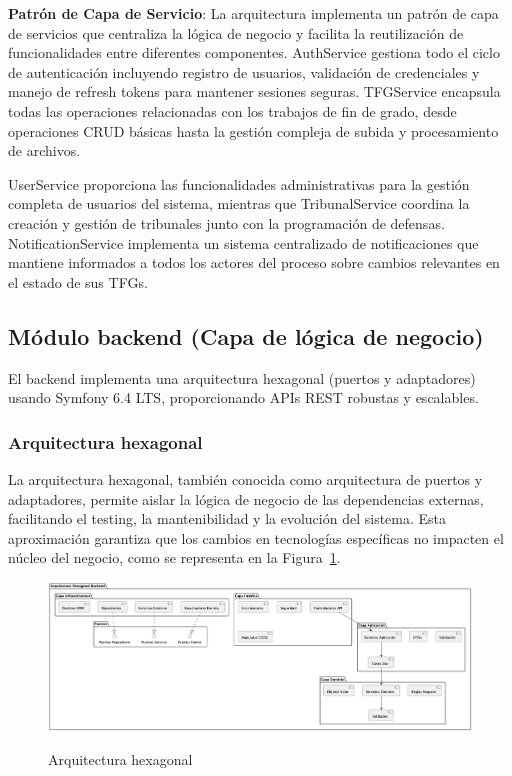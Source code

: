 \documentclass[12pt,a4paper,oneside]{report}
\providecommand{\pandocbounded}[1]{#1}
\begin{document}
\textbf{Patrón de Capa de Servicio}: La arquitectura implementa un patrón de capa de servicios que centraliza la lógica de negocio y facilita la reutilización de funcionalidades entre diferentes componentes. AuthService gestiona todo el ciclo de autenticación incluyendo registro de usuarios, validación de credenciales y manejo de refresh tokens para mantener sesiones seguras. TFGService encapsula todas las operaciones relacionadas con los trabajos de fin de grado, desde operaciones CRUD básicas hasta la gestión compleja de subida y procesamiento de archivos.

UserService proporciona las funcionalidades administrativas para la gestión completa de usuarios del sistema, mientras que TribunalService coordina la creación y gestión de tribunales junto con la programación de defensas. NotificationService implementa un sistema centralizado de notificaciones que mantiene informados a todos los actores del proceso sobre cambios relevantes en el estado de sus TFGs.

\subsection{Módulo backend (Capa de lógica de
negocio)}\label{muxf3dulo-backend-capa-de-luxf3gica-de-negocio}

El backend implementa una arquitectura hexagonal (puertos y adaptadores)
usando Symfony 6.4 LTS, proporcionando APIs REST robustas y escalables.

\subsubsection{Arquitectura hexagonal}\label{arquitectura-hexagonal}

La arquitectura hexagonal, también conocida como arquitectura de puertos y adaptadores, permite aislar la lógica de negocio de las dependencias externas, facilitando el testing, la mantenibilidad y la evolución del sistema. Esta aproximación garantiza que los cambios en tecnologías específicas no impacten el núcleo del negocio, como se representa en la Figura~\ref{fig:arquitectura-hexagonal}.

\begin{figure}[H]
\centering
\pandocbounded{\includegraphics[keepaspectratio,alt={Arquitectura hexagonal}]{processed/images/05_diseno_plantuml_1.png}}
\caption{Arquitectura hexagonal}
\label{fig:arquitectura-hexagonal}
\end{figure}
\end{document}
